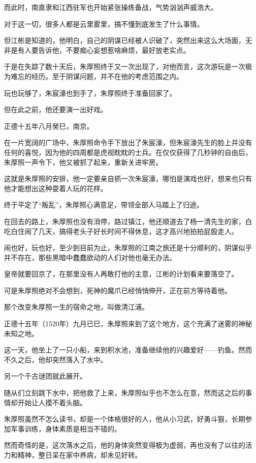 \begin{multicols}{\theparacolNo}
		而此时，南直隶和江西驻军也开始紧张操练备战，气势汹汹声威浩大。

		对于这一切，很多人都是云里雾里，搞不懂到底发生了什么事情。

		但江彬是知道的，他明白，自己的阴谋已经被人识破了，突然出来这么大场面，无非是有人要告诉他，不要痴心妄想惹啥麻烦，最好放老实点。

		于是在失踪了数十天后，朱厚照终于又一次出现了，对他而言，这次游玩是一次极为难忘的经历。至于阴谋问题，并不在他的考虑范围之内。

		玩也玩够了，朱宸濠也到手了，朱厚照终于准备回家了。

		但在此之前，他还要演一出好戏。

		正德十五年八月癸巳，南京。

		在一片宽阔的广场中，朱厚照命令手下放出了朱宸濠，但朱宸濠先生的脸上并没有任何的喜悦，因为他的四周都是虎视眈眈的士兵。在仅仅获得了几秒钟的自由后，朱厚照一声令下，他又被抓了起来，重新关进牢房。

		这就是朱厚照的安排，他一定要亲自抓一次朱宸濠，哪怕是演戏也好，想来也只有他才能想出这种耍着人玩的花样。

		终于平定了“叛乱”，朱厚照心满意足，带领全部人马踏上了归途。

		在回去的路上，朱厚照也没有消停，路过镇江，他还顺道去了杨一清先生的家，白吃白住闹了几天，搞得老头子好长时间不得休息，这才高兴地拍拍屁股走人。

		闹也好，玩也好，至少到目前为止，朱厚照的江南之旅还是十分顺利的，阴谋似乎并不存在，那些黑暗中蠢蠢欲动的人们对他也毫无办法。

		皇帝就要回京了，在那里没有人再敢打他的主意，江彬的计划看来要落空了。

		可是朱厚照绝对不会想到，死神的魔爪已经悄悄伸开，正在前方等待着他。

		那个改变朱厚照一生的宿命之地，叫做清江浦。

		正德十五年（1520年）九月已巳，朱厚照来到了这个地方，这个充满了迷雾的神秘未知之地。

		这一天，他坐上了一只小船，来到积水池，准备继续他的兴趣爱好——钓鱼。然而不久之后，他却突然落入了水中。

		另一个千古谜团就此展开。

		随从们立刻跳下水中，把他救了上来，朱厚照似乎也不怎么在意，然而这之后的事情却开始让人摸不着头脑。

		朱厚照虽然不怎么读书，却是一个体格很好的人，他从小习武，好勇斗狠，长期参加军事训练，身体素质是相当不错的。

		然而奇怪的是，这次落水之后，他的身体突然变得极为虚弱，再也没有了以往的活力和精神，整日呆在家中养病，却未见好转。


\end{multicols}
